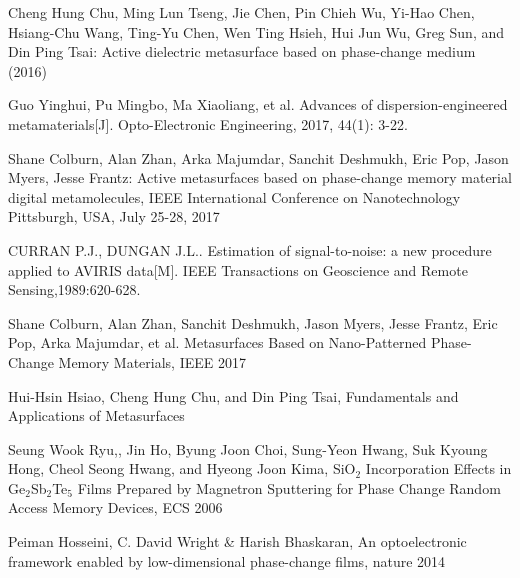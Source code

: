 \begin{thebibliography}{99}
 Cheng Hung Chu, Ming Lun Tseng, Jie Chen, Pin Chieh Wu, Yi-Hao Chen, Hsiang-Chu Wang, Ting-Yu Chen, Wen Ting Hsieh, Hui Jun Wu, Greg Sun, and Din Ping Tsai: Active dielectric metasurface based on phase-change
medium (2016)

 Guo Yinghui, Pu Mingbo, Ma Xiaoliang, et al. Advances of dispersion-engineered metamaterials[J]. Opto-Electronic Engineering, 2017, 44(1): 3-22. 

 Shane Colburn, Alan Zhan, Arka Majumdar, Sanchit Deshmukh, Eric Pop, Jason Myers, Jesse Frantz: Active metasurfaces based on phase-change memory material digital metamolecules, IEEE International Conference on Nanotechnology
Pittsburgh, USA, July 25-28, 2017

 CURRAN P.J., DUNGAN J.L.. Estimation of signal-to-noise: a new procedure applied to AVIRIS data[M]. IEEE Transactions on Geoscience and Remote Sensing,1989:620-628.

 Shane Colburn, Alan Zhan, Sanchit Deshmukh, Jason Myers, Jesse Frantz, Eric Pop, Arka Majumdar, et al. Metasurfaces Based on Nano-Patterned Phase-Change Memory Materials, IEEE 2017

 Hui-Hsin Hsiao, Cheng Hung Chu, and Din Ping Tsai, Fundamentals and Applications of Metasurfaces

 Seung Wook Ryu,, Jin Ho, Byung Joon Choi, Sung-Yeon Hwang, Suk Kyoung Hong, Cheol Seong Hwang, and Hyeong Joon Kima, SiO$_{2}$ Incorporation Effects in Ge$_{2}$Sb$_{2}$Te$_{5}$ Films Prepared
by Magnetron Sputtering for Phase Change Random Access Memory Devices, ECS 2006

 Peiman Hosseini, C. David Wright & Harish Bhaskaran, An optoelectronic framework enabled by low-dimensional phase-change films, nature 2014

\end{thebibliography}